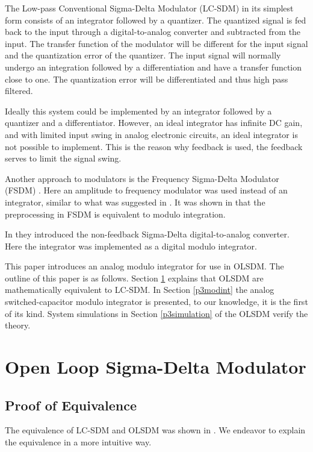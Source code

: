 The Low-pass Conventional Sigma-Delta Modulator (LC-SDM) in its simplest form consists of an
integrator followed by a quantizer. The quantized signal is fed back
to the input through a digital-to-analog converter and subtracted from
the input. The transfer function of the modulator will be different for the
input signal and the quantization error of the quantizer. The input
signal will normally undergo an integration followed by a
differentiation and have a transfer function close to one. The quantization error will be
differentiated and thus high pass
filtered. 

Ideally this system could be implemented by an integrator
followed by a quantizer and a differentiator. However, an ideal integrator
has infinite DC gain, and with limited input swing in analog electronic
circuits, an ideal integrator is not possible to implement. This is
the reason why feedback is used, the feedback serves to
limit the signal swing. 

Another approach to \sd modulators is the Frequency
Sigma-Delta  Modulator (FSDM) \cite{hovin97}. Here 
an amplitude to frequency modulator was used instead of an integrator, similar to what was
suggested in \cite{claasen80}. It was shown in \cite{hovin97} that the 
preprocessing in FSDM is equivalent to modulo integration. 

In \cite{wisland02} they introduced the
non-feedback Sigma-Delta digital-to-analog converter. Here the
integrator was implemented as a digital modulo integrator.

This paper introduces an analog modulo integrator for use in 
OLSDM. The outline of this paper is as follows.
Section \ref{p3modolsd} explains that OLSDM are mathematically equivalent to LC-SDM.
In Section \ref{p3modint} the analog switched-capacitor modulo
integrator is presented, to our knowledge, it is the first of its
kind. System simulations in Section \ref{p3simulation} of the OLSDM 
verify the theory. 

\section{Open Loop Sigma-Delta Modulator} \label{p3modolsd}

\subsection{Proof of Equivalence }
The equivalence of LC-SDM and OLSDM was shown in \cite{wisland02}. 
We endeavor to explain the equivalence in a more intuitive way. 


